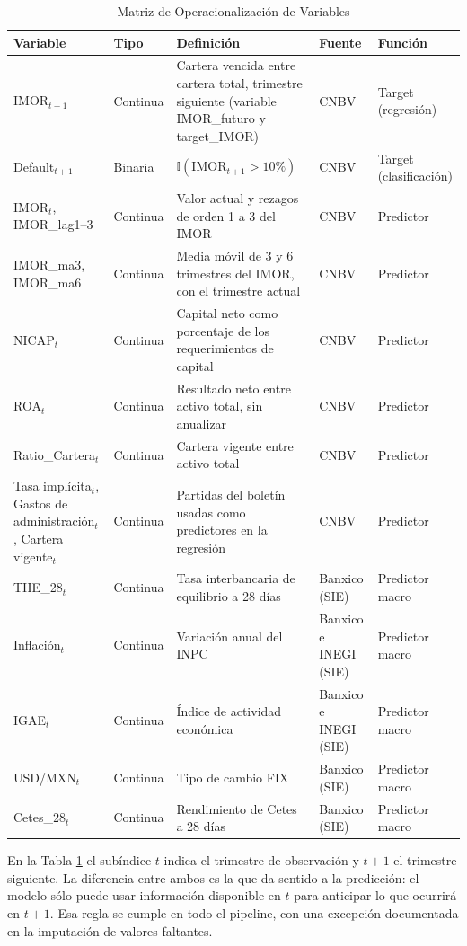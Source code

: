 \begin{table}[H]
\centering
\caption{Matriz de Operacionalización de Variables}
\label{tab:variables}
\small
\begin{tabularx}{\textwidth}{p{2.6cm}p{1.6cm}Xp{1.6cm}p{2cm}}
\toprule
\textbf{Variable} & \textbf{Tipo} & \textbf{Definición} & \textbf{Fuente} & \textbf{Función} \\
\midrule
IMOR$_{t+1}$ & Continua & Cartera vencida entre cartera total, trimestre siguiente (variable IMOR\_futuro y target\_IMOR) & CNBV & Target (regresión) \\
Default$_{t+1}$ & Binaria & $\mathbb{I}(\text{IMOR}_{t+1}>10\%)$ & CNBV & Target (clasificación) \\
IMOR$_{t}$, IMOR\_lag1--3 & Continua & Valor actual y rezagos de orden 1 a 3 del IMOR & CNBV & Predictor \\
IMOR\_ma3, IMOR\_ma6 & Continua & Media móvil de 3 y 6 trimestres del IMOR, con el trimestre actual & CNBV & Predictor \\
NICAP$_t$ & Continua & Capital neto como porcentaje de los requerimientos de capital & CNBV & Predictor \\
ROA$_t$ & Continua & Resultado neto entre activo total, sin anualizar & CNBV & Predictor \\
Ratio\_Cartera$_t$ & Continua & Cartera vigente entre activo total & CNBV & Predictor \\
Tasa implícita$_t$, Gastos de administración$_t$, Cartera vigente$_t$ & Continua & Partidas del boletín usadas como predictores en la regresión & CNBV & Predictor \\
TIIE\_28$_t$ & Continua & Tasa interbancaria de equilibrio a 28 días & Banxico (SIE) & Predictor macro \\
Inflación$_t$ & Continua & Variación anual del INPC & Banxico e INEGI (SIE) & Predictor macro \\
IGAE$_t$ & Continua & Índice de actividad económica & Banxico e INEGI (SIE) & Predictor macro \\
USD/MXN$_t$ & Continua & Tipo de cambio FIX & Banxico (SIE) & Predictor macro \\
Cetes\_28$_t$ & Continua & Rendimiento de Cetes a 28 días & Banxico (SIE) & Predictor macro \\
\bottomrule
\end{tabularx}
\end{table}

En la Tabla \ref{tab:variables} el subíndice $t$ indica el trimestre de observación y $t+1$ el trimestre siguiente. La diferencia entre ambos es la que da sentido a la predicción: el modelo sólo puede usar información disponible en $t$ para anticipar lo que ocurrirá en $t+1$. Esa regla se cumple en todo el pipeline, con una excepción documentada en la imputación de valores faltantes.

